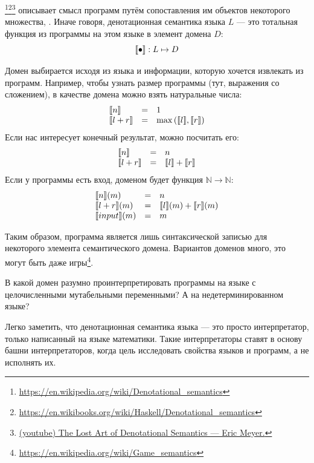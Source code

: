 \footnote{\url{https://en.wikipedia.org/wiki/Denotational_semantics}}\footnote{\url{https://en.wikibooks.org/wiki/Haskell/Denotational_semantics}}\footnote{\href{https://youtu.be/pQyH0p-XJzE?si=TUEzrpHhJZfO7dTF}{(youtube) The Lost Art of Denotational Semantics --- Eric Meyer.}} описывает смысл программ путём сопоставления им объектов некоторого множества, .
Иначе говоря, денотационная семантика языка $L$ --- это тотальная функция из программы на этом языке в элемент домена $D$:
\[
    \llbracket{\bullet}\rrbracket : L \mapsto D
\]

Домен выбирается исходя из языка и информации, которую хочется извлекать из программ.
Например, чтобы узнать размер программы (тут, выражения со сложением), в качестве домена можно взять натуральные числа:
\[
    \begin{array}{lcl}
        \llbracket{n}\rrbracket     & = & 1                            \\
        \llbracket{l + r}\rrbracket & = & \max{(\llbracket{l}\rrbracket, \llbracket{r}\rrbracket)}
    \end{array}
\]
Если нас интересует конечный результат, можно посчитать его:
\[
    \begin{array}{lcl}
        \llbracket{n}\rrbracket     & = & n                     \\
        \llbracket{l + r}\rrbracket & = & \llbracket{l}\rrbracket + \llbracket{r}\rrbracket
    \end{array}
\]
Если у программы есть вход, доменом будет функция $\mathbb{N}\to\mathbb{N}$:
\[
    \begin{array}{lcl}
        \llbracket{n}\rrbracket(m)     & = & n                           \\
        \llbracket{l + r}\rrbracket(m) & = & \llbracket{l}\rrbracket(m) + \llbracket{r}\rrbracket(m) \\
        \llbracket{input}\rrbracket(m) & = & m
    \end{array}
\]

Таким образом, программа является лишь синтаксической записью для некоторого элемента семантического домена.
Вариантов доменов много, это могут быть даже игры\footnote{\url{https://en.wikipedia.org/wiki/Game_semantics}}. %

\begin{task}
    В какой домен разумно проинтерпретировать программы на языке с целочисленными мутабельными переменными?
    А на недетерминированном языке?
\end{task}

Легко заметить, что денотационная семантика языка --- это просто интерпретатор, только написанный на языке математики.
Такие интерпретаторы ставят в основу башни интерпретаторов, когда цель исследовать свойства языков и программ, а не исполнять их.


